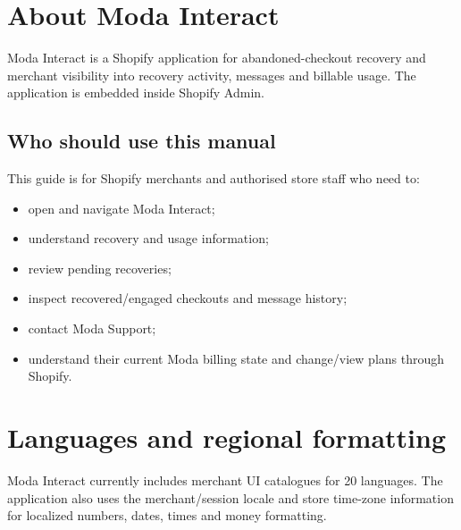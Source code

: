 \chapter{About Moda Interact}

Moda Interact is a Shopify application for abandoned-checkout recovery and merchant visibility into recovery activity, messages and billable usage. The application is embedded inside Shopify Admin.


\section{Who should use this manual}
This guide is for Shopify merchants and authorised store staff who need to:
\begin{itemize}
  \item open and navigate Moda Interact;
  \item understand recovery and usage information;
  \item review pending recoveries;
  \item inspect recovered/engaged checkouts and message history;
  \item contact Moda Support;
  \item understand their current Moda billing state and change/view plans through Shopify.
\end{itemize}

\chapter{Languages and regional formatting}

Moda Interact currently includes merchant UI catalogues for 20 languages. The application also uses the merchant/session locale and store time-zone information for localized numbers, dates, times and money formatting.

